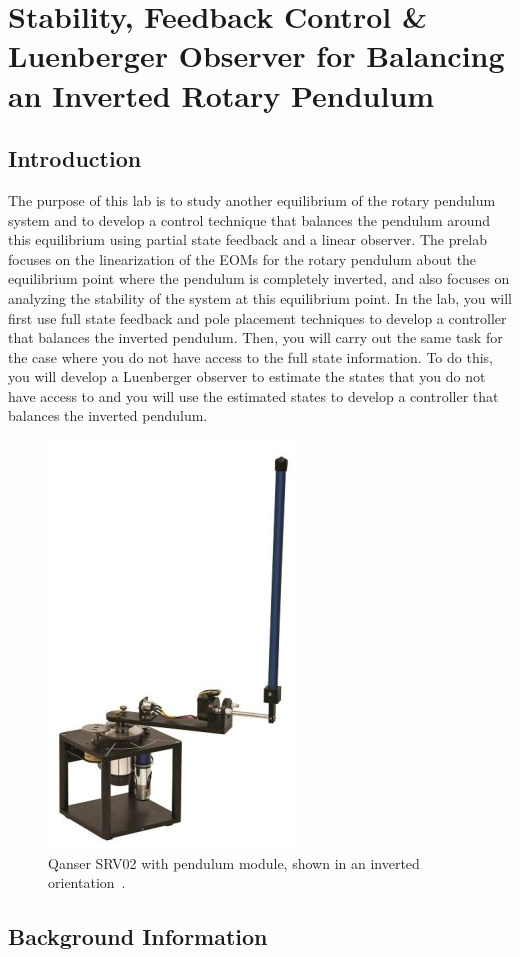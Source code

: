 \chapter{Stability, Feedback Control \& Luenberger Observer for Balancing an Inverted Rotary Pendulum}

\section{Introduction}\label{section:lab3_intro}
The purpose of this lab is to study another equilibrium of the rotary pendulum system and to develop a control technique that balances the pendulum around this equilibrium using partial state feedback and a linear observer. The prelab focuses on the linearization of the EOMs for the rotary pendulum about the equilibrium point where the pendulum is completely inverted, and also focuses on analyzing the stability of the system at this equilibrium point. In the lab, you will first use full state feedback and pole placement techniques to develop a controller that balances the inverted pendulum. Then, you will carry out the same task for the case where you do not have access to the full state information. To do this, you will develop a Luenberger observer to estimate the states that you do not have access to and you will use the estimated states to develop a controller that balances the inverted pendulum.
\begin{figure}[htb!]
    \centering
    \includegraphics[width=.3\linewidth]{eps/lab_3/quanser.eps}
    \caption{Qanser SRV02 with pendulum module, shown in an inverted orientation~\cite{Q-Flex-Beam}.}
    \label{fig:lab3_plant}
\end{figure}
\section{Background Information}\label{section:lab3_prelab}
